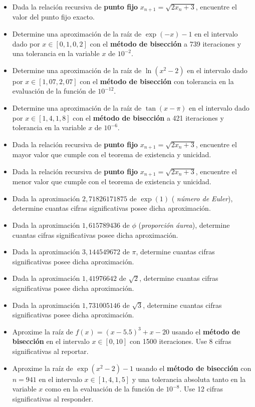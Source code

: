 \documentclass[12pt]{article}
\begin{document}
\begin{itemize}
\item Dada la relación recursiva de \textbf{punto fijo} \(x_{n+1}=\sqrt{2x_n+3}\), encuentre el valor del punto fijo exacto.
\item Determine una aproximación de la raíz de \(\exp (-x) - 1\) en el intervalo dado por \(x \in \left[0{,}1, 0{,}2\right]\) con el \textbf{método de bisección} a 739 iteraciones y una tolerancia en la variable \(x\) de \(10^{-2}\).
\item Determine una aproximación de la raíz de \(\ln(x^2-2)\) en el intervalo dado por \(x \in \left[ 1{,}07, 2{,}07 \right]\) con el \textbf{método de bisección} con tolerancia en la evaluación de la función de \(10^{-12}\).
\item Determine una aproximación de la raíz de \(\tan(x - \pi)\) en el intervalo dado por \(x \in \left[ 1{,}4, 1{,}8 \right]\) con el \textbf{método de bisección} a 421 iteraciones y tolerancia en la variable \(x\) de \(10^{-6}\).
\item Dada la relación recursiva de \textbf{punto fijo} \(x_{n+1}=\sqrt{2x_n+3}\), encuentre el mayor valor que cumple con el teorema de existencia y unicidad.
\item Dada la relación recursiva de \textbf{punto fijo} \(x_{n+1}=\sqrt{2x_n+3}\), encuentre el menor valor que cumple con el teorema de existencia y unicidad.
\item Dada la aproximación \(2{,}71826171875\) de \(\exp(1)\) (\textit{ número de Euler}), determine cuantas cifras significativas posee dicha aproximación.
\item Dada la aproximación \(1{,}615789436\) de \(\phi\) (\textit{proporción áurea}), determine cuantas cifras significativas posee dicha aproximación.
\item Dada la aproximación \(3{,}144549672\) de \(\pi\), determine cuantas cifras significativas posee dicha aproximación.
\item Dada la aproximación \(1{,}41976642\) de \(\sqrt{2}\), determine cuantas cifras significativas posee dicha aproximación.
\item Dada la aproximación \(1{,}731005146\) de \(\sqrt{3}\), determine cuantas cifras significativas posee dicha aproximación.
\item Aproxime la raíz de \(f(x) = (x-5.5)^3 + x - 20\)  usando el \textbf{método de bisección} en el intervalo \(x \in \left[0, 10\right]\) con 1500 iteraciones. Use 8 cifras significativas al reportar.
\item Aproxime la raíz de \(\exp(x^2 - 2) - 1\) usando el \textbf{método de bisección} con \(n=941\) en el intervalo \(x \in \left[1{,}4, 1{,}5\right]\) y una tolerancia absoluta tanto en la variable \(x\) como en la evaluación de la función de \(10^{-8}\). Use 12 cifras significativas al responder.

\end{itemize}
\end{document}
